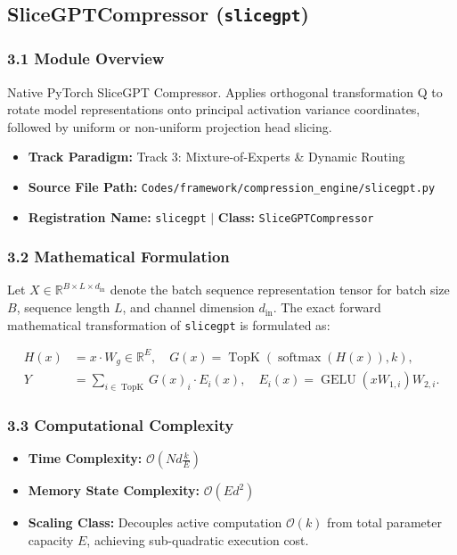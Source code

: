 \subsection{SliceGPTCompressor (\texttt{slicegpt})}
\label{sec:app_module_slicegpt}

\subsubsection*{3.1 Module Overview}
Native PyTorch SliceGPT Compressor.  Applies orthogonal transformation Q to rotate model representations onto principal activation variance coordinates, followed by uniform or non-uniform projection head slicing.
\begin{itemize}
    \item \textbf{Track Paradigm:} Track 3: Mixture-of-Experts & Dynamic Routing
    \item \textbf{Source File Path:} \texttt{Codes/framework/compression\_engine/slicegpt.py}
    \item \textbf{Registration Name:} \texttt{slicegpt} $\mid$ \textbf{Class:} \texttt{SliceGPTCompressor}
\end{itemize}

\subsubsection*{3.2 Mathematical Formulation}
Let $X \in \mathbb{R}^{B \times L \times d_{\text{in}}}$ denote the batch sequence representation tensor for batch size $B$, sequence length $L$, and channel dimension $d_{\text{in}}$. The exact forward mathematical transformation of \texttt{slicegpt} is formulated as:

\begin{align}
H(x) &= x \cdot W_g \in \mathbb{R}^{E}, \quad G(x) = \operatorname{TopK}\left(\operatorname{softmax}(H(x)), k\right), \\
Y &= \sum_{i \in \operatorname{TopK}} G(x)_i \cdot E_i(x), \quad E_i(x) = \operatorname{GELU}(x W_{1, i}) W_{2, i}.
\end{align}


\subsubsection*{3.3 Computational Complexity}
\begin{itemize}
    \item \textbf{Time Complexity:} $\mathcal{O}(N d \frac{k}{E})$
    \item \textbf{Memory State Complexity:} $\mathcal{O}(E d^2)$
    \item \textbf{Scaling Class:} Decouples active computation $\mathcal{O}(k)$ from total parameter capacity $E$, achieving sub-quadratic execution cost.
\end{itemize}

